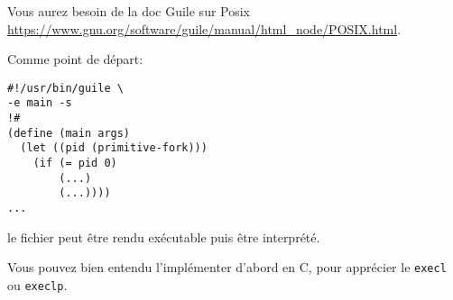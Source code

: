 \documentclass{exam}
\begin{document}
\begin{questions}
  Vous aurez besoin de la doc Guile sur Posix
  \url{https://www.gnu.org/software/guile/manual/html_node/POSIX.html}.

  Comme point de d\'epart:
\begin{verbatim}
#!/usr/bin/guile \
-e main -s
!#
(define (main args)
  (let ((pid (primitive-fork)))
    (if (= pid 0)
        (...)
        (...))))
...
\end{verbatim}
  le fichier peut être rendu exécutable puis être interprété.

  Vous pouvez bien entendu l'implémenter d'abord en C, pour apprécier le
  \texttt{execl} ou \texttt{execlp}.
  \begin{solution}
    \inputminted{scheme}{corrected/fork.scm}
  \end{solution}
\end{questions}
\end{document}
